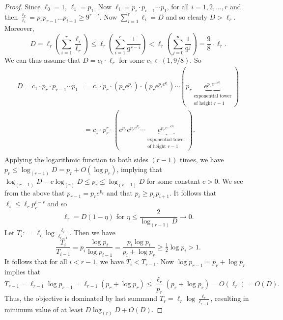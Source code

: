 \documentclass[10pt,a4paper]{amsart}
\newcommand{\ra}{\rightarrow}
\begin{document}
\begin{proof}
Since $\ell_0=1$, $\ell_1=p_1$. Now $\ell_i = p_i\cdot p_{i-1}\cdots p_1$, for all $i=1,2,...,r$ and then $\frac{\ell_r}{\ell_i} = p_rp_{r-1}...p_{i+1} \geq 9^{r-i}$. Now $\sum\limits_{i=1}^r \ell_i = D$ and so clearly $D > \ell_r$. Moreover, 
\[
D = \ell_r \left(\sum\limits_{i=1}^r \frac{\ell_i}{\ell_r}\right) \leq \ell_r \left(\sum\limits_{i=1}^r \frac{1}{9^{r-i}}\right) < \ell_r\left(\sum\limits_{j=0}^\infty \frac{1}{9^j}\right) = \frac{9}{8}\cdot \ell_r. 
\]
We can thus assume that $D = c_1 \cdot \ell_r$ for some $c_1 \in (1,9/8)$. So
\begin{align*}
D= c_1 \cdot p_r \cdot p_{r-1} \cdots p_1 & = c_1 \cdot p_r \cdot \left(p_r e^{p_r}\right) \cdot\left(p_r e^{p_r e^{p_r}}\right) \cdots \left(p_r \underbrace{e^{p_r e^{... e^{p_r}}}}_{\substack{\text{exponential tower}\\\text{of height }r-1}}\right)\\
		& = c_1 \cdot p_r^r \cdot \left(e^{p_r} e^{p_r e^{p_r}} \cdots \underbrace{e^{p_r e^{... e^{p_r}}}}_{\substack{\text{exponential tower}\\\text{of height }r-1}} \right).\\
\end{align*}
Applying the logarithmic function to both sides $(r-1)$ times, we have $p_r\leq \log_{(r-1)} D = p_r + O(\log p_r)$, implying that $\log_{(r-1)}D-c\log_{(r)}D\leq p_r\leq \log_{(r-1)}D$ for some constant $c>0$. We see from the above that $p_{r-1}=p_re^{p_r}$ and that $p_i\geq p_rp_{i+1}$. It follows that $\ell_i\leq \ell_rp_r^{i-r}$ and so 
\[
\ell_r = D(1-\eta)\text{ for }\eta \leq \frac{2}{\log_{(r-1)}D} \ra 0.
\]
 Let $T_i : = \ell_i\log\frac{\ell_i}{\ell_{i-1}}$. Then we have 
\[
\frac{T_i}{T_{i-1}}=p_i\frac{\log p_i}{\log p_{i-1}}=\frac{p_i\log p_i}{p_i+\log p_r}\geq \tfrac12\log p_i>1.
\]
It follows that for all $i<r-1$, we have $T_i <T_{r-1}$. Now $\log p_{r-1} = p_r + \log p_r$ implies that 
\[
T_{r-1} = \ell_{r-1}\log p_{r-1}=\ell_{r-1}(p_r + \log p_r)\leq \frac{\ell_r}{p_r}(p_r + \log p_r)  = O(\ell_r) = O(D).
\]
Thus, the objective is dominated by last summand $T_r = \ell_r\log\frac{\ell_r}{\ell_{r-1}}$, resulting in minimum value of at least $D\log_{(r)}D+O(D)$.
 \end{proof}
\end{document}

